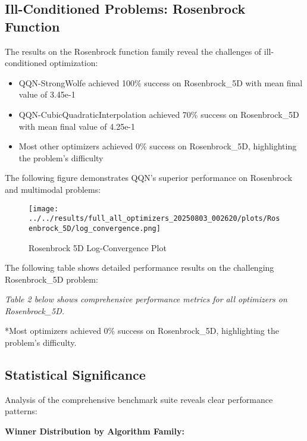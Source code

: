 \hypertarget{ill-conditioned-problems-rosenbrock-function}{%
\subsection{Ill-Conditioned Problems: Rosenbrock Function}\label{ill-conditioned-problems-rosenbrock-function}}

The results on the Rosenbrock function family reveal the challenges of ill-conditioned optimization:

\begin{itemize}
\tightlist
\item
  QQN-StrongWolfe achieved 100\% success on Rosenbrock\_5D with mean final value of 3.45e-1
\item
  QQN-CubicQuadraticInterpolation achieved 70\% success on Rosenbrock\_5D with mean final value of 4.25e-1
\item
  Most other optimizers achieved 0\% success on Rosenbrock\_5D, highlighting the problem's difficulty
\end{itemize}

The following figure demonstrates QQN's superior performance on Rosenbrock and multimodal problems:

\begin{figure}
\centering
\texttt{[image: ../../results/full\_all\_optimizers\_20250803\_002620/plots/Rosenbrock\_5D/log\_convergence.png]}
\caption{Rosenbrock 5D Log-Convergence Plot}
\end{figure}

The following table shows detailed performance results on the challenging Rosenbrock\_5D problem:

\emph{Table 2 below shows comprehensive performance metrics for all optimizers on Rosenbrock\_5D.}

{}

*Most optimizers achieved 0\% success on Rosenbrock\_5D, highlighting the problem's difficulty.

\hypertarget{statistical-significance}{%
\subsection{Statistical Significance}\label{statistical-significance}}

Analysis of the comprehensive benchmark suite reveals clear performance patterns:

\textbf{Winner Distribution by Algorithm Family:}

